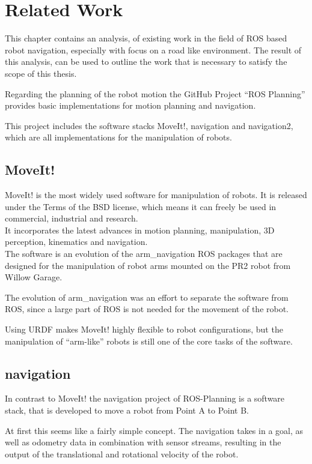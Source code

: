 \chapter{Related Work}
\label{relatedwork}

This chapter contains an analysis, of existing work in the field of ROS based robot navigation, especially with focus on a road like environment. The result of this analysis, can be used to outline the work that is necessary to satisfy the scope of this thesis.

Regarding the planning of the robot motion the GitHub Project ``ROS Planning'' provides basic implementations for motion planning and navigation\cite{rosplanning}.

This project includes the software stacks MoveIt!, navigation and navigation2, which are all implementations for the manipulation of robots.\\
\section{MoveIt!}
MoveIt! is the most widely used software for manipulation of robots. It is released under the Terms of the BSD license, which means it can freely be used in commercial, industrial and research\cite{moveit}.\\
It incorporates the latest advances in motion planning, manipulation, 3D perception, kinematics and navigation.\\

The software is an evolution of the arm\_navigation ROS packages that are designed for the manipulation of robot arms mounted on the PR2 robot from Willow Garage\cite{chitta2012moveit}\cite{willow}.

The evolution of arm\_navigation was an effort to separate the software from ROS, since a large part of ROS is not needed for the movement of the robot. 

Using URDF makes MoveIt! highly flexible to robot configurations, but the manipulation of ``arm-like'' robots is still one of the core tasks of the software.

\section{navigation}
In contrast to MoveIt! the navigation project of ROS-Planning is a software stack, that is developed to move a robot from Point A to Point B.

At first this seems like a fairly simple concept. The navigation takes in a goal, as well as odometry data in combination with sensor streams, resulting in the output of the translational and rotational velocity of the robot.

